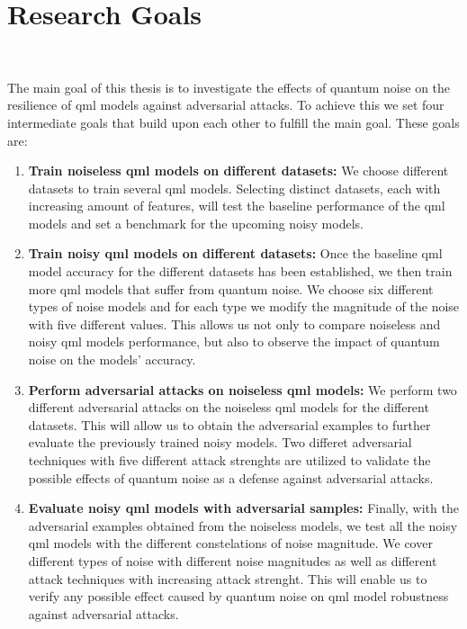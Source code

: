 \section{Research Goals} \

The main goal of this thesis is to investigate the effects of quantum noise
on the resilience of \ac{qml} models against adversarial
attacks. To achieve this we set four intermediate goals that build
upon each other to fulfill the main goal. These goals are: \

\begin{enumerate}
    \item \textbf{Train noiseless \ac{qml} models on different datasets:}
            We choose different datasets to train several \ac{qml} models.
            Selecting distinct datasets, each with increasing amount of
            features, will test the baseline performance of the \ac{qml}
            models and set a benchmark for the upcoming noisy models. \
    \item \textbf{Train noisy \ac{qml} models on different datasets:} Once
            the baseline \ac{qml} model accuracy for the different datasets
            has been established, we then train more \ac{qml} models that
            suffer from quantum noise. We choose six different types of
            noise models and for each type we modify the magnitude of the
            noise with five different values. This allows us not only
            to compare noiseless and noisy \ac{qml} models performance,
            but also to observe the impact of quantum noise on the models'
            accuracy. \
    \item \textbf{Perform adversarial attacks on noiseless \ac{qml} models:}
            We perform two different adversarial attacks on the noiseless
            \ac{qml} models for the different datasets. This will allow
            us to obtain the adversarial examples to further evaluate the
            previously trained noisy models. Two differet adversarial
            techniques with five different attack strenghts are utilized
            to validate the possible effects of quantum noise as a defense
            against adversarial attacks. \
    \item \textbf{Evaluate noisy \ac{qml} models with adversarial samples:}
            Finally, with the adversarial examples obtained from the noiseless
            models, we test all the noisy \ac{qml} models with the different
            constelations of noise magnitude. We cover different types of noise
            with different noise magnitudes as well as different attack techniques
            with increasing attack strenght. This will enable us to verify
            any possible effect caused by quantum noise on \ac{qml} model robustness
            against adversarial attacks. \
  \end{enumerate} \

